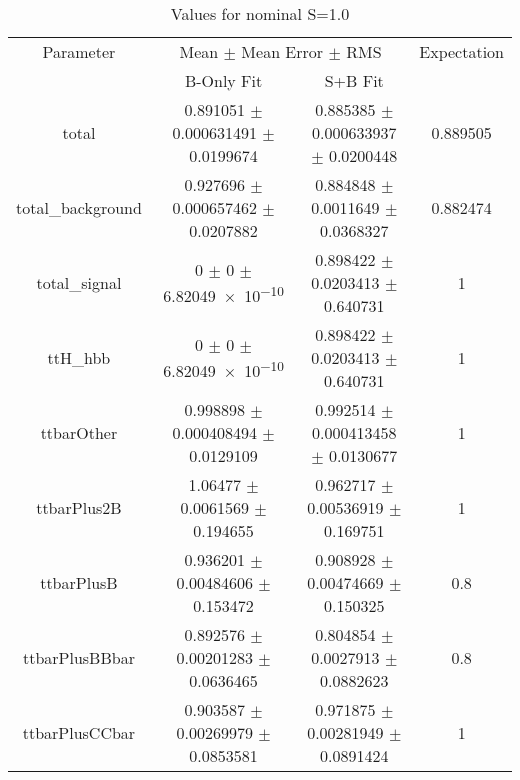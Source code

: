 \begin{table}
\centering
\caption{Values for nominal S=1.0}
\begin{tabular}{cccc}
\toprule
Parameter & \multicolumn{2}{c}{Mean $\pm$ Mean Error $\pm$ RMS} & Expectation\\
 & B-Only Fit & S+B Fit & \\
\midrule
total & \num{0.891051} $\pm$ \num{0.000631491} $\pm$ \num{0.0199674} & \num{0.885385} $\pm$ \num{0.000633937} $\pm$ \num{0.0200448} & \num{0.889505}\\
total\_background & \num{0.927696} $\pm$ \num{0.000657462} $\pm$ \num{0.0207882} & \num{0.884848} $\pm$ \num{0.0011649} $\pm$ \num{0.0368327} & \num{0.882474}\\
total\_signal & \num{0} $\pm$ \num{0} $\pm$ \num{6.82049e-10} & \num{0.898422} $\pm$ \num{0.0203413} $\pm$ \num{0.640731} & \num{1}\\
ttH\_hbb & \num{0} $\pm$ \num{0} $\pm$ \num{6.82049e-10} & \num{0.898422} $\pm$ \num{0.0203413} $\pm$ \num{0.640731} & \num{1}\\
ttbarOther & \num{0.998898} $\pm$ \num{0.000408494} $\pm$ \num{0.0129109} & \num{0.992514} $\pm$ \num{0.000413458} $\pm$ \num{0.0130677} & \num{1}\\
ttbarPlus2B & \num{1.06477} $\pm$ \num{0.0061569} $\pm$ \num{0.194655} & \num{0.962717} $\pm$ \num{0.00536919} $\pm$ \num{0.169751} & \num{1}\\
ttbarPlusB & \num{0.936201} $\pm$ \num{0.00484606} $\pm$ \num{0.153472} & \num{0.908928} $\pm$ \num{0.00474669} $\pm$ \num{0.150325} & \num{0.8}\\
ttbarPlusBBbar & \num{0.892576} $\pm$ \num{0.00201283} $\pm$ \num{0.0636465} & \num{0.804854} $\pm$ \num{0.0027913} $\pm$ \num{0.0882623} & \num{0.8}\\
ttbarPlusCCbar & \num{0.903587} $\pm$ \num{0.00269979} $\pm$ \num{0.0853581} & \num{0.971875} $\pm$ \num{0.00281949} $\pm$ \num{0.0891424} & \num{1}\\
\bottomrule
\end{tabular}
\end{table}